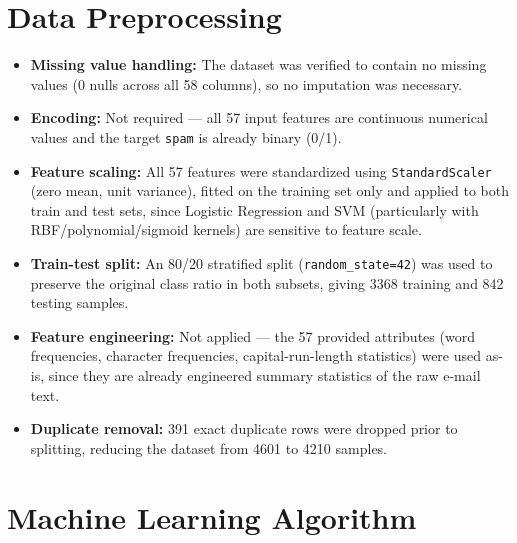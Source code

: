 \documentclass[12pt,a4paper]{article}
\begin{document}
\section{Data Preprocessing}

\begin{itemize}
\item \textbf{Missing value handling:} The dataset was verified to contain no missing values (0 nulls across all 58 columns), so no imputation was necessary.
\item \textbf{Encoding:} Not required — all 57 input features are continuous numerical values and the target \texttt{spam} is already binary (0/1).
\item \textbf{Feature scaling:} All 57 features were standardized using \texttt{StandardScaler} (zero mean, unit variance), fitted on the training set only and applied to both train and test sets, since Logistic Regression and SVM (particularly with RBF/polynomial/sigmoid kernels) are sensitive to feature scale.
\item \textbf{Train-test split:} An 80/20 stratified split (\texttt{random\_state=42}) was used to preserve the original class ratio in both subsets, giving 3368 training and 842 testing samples.
\item \textbf{Feature engineering:} Not applied — the 57 provided attributes (word frequencies, character frequencies, capital-run-length statistics) were used as-is, since they are already engineered summary statistics of the raw e-mail text.
\item \textbf{Duplicate removal:} 391 exact duplicate rows were dropped prior to splitting, reducing the dataset from 4601 to 4210 samples.
\end{itemize}

\section{Machine Learning Algorithm}
\end{document}
